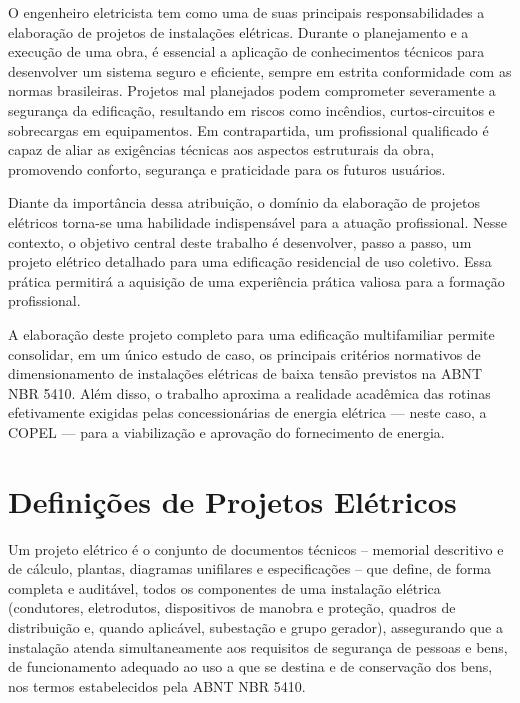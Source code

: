 \documentclass[12pt,openright,oneside,a4paper,brazil]{abntex2}
\begin{document}
\hspace{1.27cm}O engenheiro eletricista tem como uma de suas principais responsabilidades a elaboração de projetos de instalações elétricas. Durante o planejamento e a execução de uma obra, é essencial a aplicação de conhecimentos técnicos para desenvolver um sistema seguro e eficiente, sempre em estrita conformidade com as normas brasileiras. Projetos mal planejados podem comprometer severamente a segurança da edificação, resultando em riscos como incêndios, curtos-circuitos e sobrecargas em equipamentos. Em contrapartida, um profissional qualificado é capaz de aliar as exigências técnicas aos aspectos estruturais da obra, promovendo conforto, segurança e praticidade para os futuros usuários.

Diante da importância dessa atribuição, o domínio da elaboração de projetos elétricos torna-se uma habilidade indispensável para a atuação profissional. Nesse contexto, o objetivo central deste trabalho é desenvolver, passo a passo, um projeto elétrico detalhado para uma edificação residencial de uso coletivo. Essa prática permitirá a aquisição de uma experiência prática valiosa para a formação profissional.

A elaboração deste projeto completo para uma edificação multifamiliar permite consolidar, em um único estudo de caso, os principais critérios normativos de dimensionamento de instalações elétricas de baixa tensão previstos na ABNT NBR 5410. Além disso, o trabalho aproxima a realidade acadêmica das rotinas efetivamente exigidas pelas concessionárias de energia elétrica — neste caso, a COPEL — para a viabilização e aprovação do fornecimento de energia.

\section{Definições de Projetos Elétricos}

\hspace{1.27cm}Um projeto elétrico é o conjunto de documentos técnicos -- memorial
descritivo e de cálculo, plantas, diagramas unifilares e especificações --
que define, de forma completa e auditável, todos os componentes de uma
instalação elétrica (condutores, eletrodutos, dispositivos de manobra e
proteção, quadros de distribuição e, quando aplicável, subestação e grupo
gerador), assegurando que a instalação atenda simultaneamente aos
requisitos de segurança de pessoas e bens, de funcionamento adequado ao uso
a que se destina e de conservação dos bens, nos termos estabelecidos pela
ABNT NBR 5410.
\end{document}
